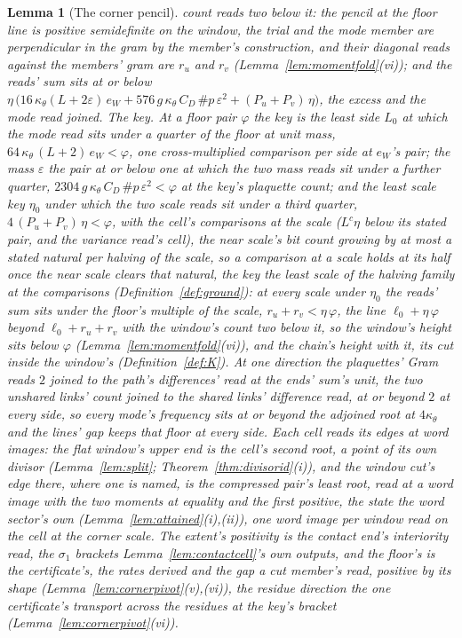 \documentclass[11pt]{article}
\newtheorem{lemma}{Lemma}
\theoremstyle{definition}
\begin{document}
\begin{lemma}[The corner pencil]
count reads two below it: the pencil at the floor line is positive
semidefinite on the window, the trial and the mode member are
perpendicular in the gram by the member's construction, and their
diagonal reads against the members' gram are $r_u$ and $r_v$
(Lemma~\ref{lem:momentfold}(vi)); and the reads' sum sits at or
below
$\eta\,\big(16\,\kappa_\theta(L+2\varepsilon)\,e_W+576\,g\,\kappa_\theta\,C_D\,\#p\,\varepsilon^{2}
+(P_u+P_v)\,\eta\big)$, the excess and the mode read joined.
\emph{The key.} At a floor pair $\varphi$ the \emph{key} is the
least side $L_0$ at which the mode read sits under a quarter of the
floor at unit mass, $64\,\kappa_\theta\,(L+2)\,e_W<\varphi$, one
cross-multiplied comparison per side at $e_W$'s pair; the
\emph{mass} $\varepsilon$ the pair at or below one at which the two
mass reads sit under a further quarter,
$2304\,g\,\kappa_\theta\,C_D\,\#p\,\varepsilon^{2}<\varphi$ at the key's
plaquette count; and the least scale key $\eta_0$ under which the
two scale reads sit under a third quarter,
$4\,(P_u+P_v)\,\eta<\varphi$, with the cell's comparisons at the
scale ($L^{c}\eta$ below its stated pair, and the variance read's
cell), the near scale's bit count growing by at most a stated
natural per halving of the scale, so a comparison at a scale holds
at its half once the near scale clears that natural, the key the
least scale of the halving family at the comparisons
(Definition~\ref{def:ground}): at every scale under $\eta_0$ the
reads' sum sits under the floor's multiple of the scale,
$r_u+r_v<\eta\,\varphi$, the line $\ell_0+\eta\,\varphi$ beyond
$\ell_0+r_u+r_v$ with the window's count two below it, so the
window's height sits below $\varphi$
(Lemma~\ref{lem:momentfold}(vi)), and the chain's height with it,
its cut inside the window's (Definition~\ref{def:K}). At one
direction the plaquettes' Gram reads $2$ joined to the path's
differences' read at the ends' sum's unit, the two unshared links'
count joined to the shared links' difference read, at or beyond $2$
at every side,
so every mode's frequency sits at or beyond the adjoined root at
$4\kappa_\theta$ and the lines' gap keeps that floor at every side.
Each cell reads its edges at word
images: the flat window's upper end is the cell's second root, a
point of its own divisor (Lemma~\ref{lem:split};
Theorem~\ref{thm:divisorid}(i)), and the window cut's edge there,
where one is named, is the compressed pair's least root, read at a
word image with the two moments at equality and the first
positive, the state the word sector's own
(Lemma~\ref{lem:attained}(i),(ii)), one word image per window read
on the cell at the corner scale.
The extent's positivity is
the contact end's interiority read, the $\sigma_1$ brackets
Lemma~\ref{lem:contactcell}'s own outputs, and the floor's is the
certificate's, the rates derived and the gap a cut member's read,
positive by its shape (Lemma~\ref{lem:cornerpivot}(v),(vi)), the
residue direction the one certificate's transport across the
residues at the key's bracket (Lemma~\ref{lem:cornerpivot}(vi)).

\end{lemma}
\end{document}
